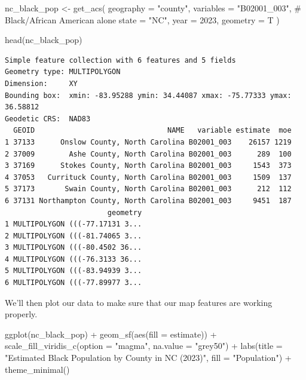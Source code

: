 \documentclass[
  letterpaper,
  DIV=11,
  numbers=noendperiod]{scrartcl}
\newenvironment{Shaded}{\begin{snugshade}}{\end{snugshade}}
\newcommand{\AttributeTok}[1]{\textcolor[rgb]{0.40,0.45,0.13}{#1}}
\newcommand{\CommentTok}[1]{\textcolor[rgb]{0.37,0.37,0.37}{#1}}
\newcommand{\DecValTok}[1]{\textcolor[rgb]{0.68,0.00,0.00}{#1}}
\newcommand{\FunctionTok}[1]{\textcolor[rgb]{0.28,0.35,0.67}{#1}}
\newcommand{\NormalTok}[1]{\textcolor[rgb]{0.00,0.23,0.31}{#1}}
\newcommand{\OtherTok}[1]{\textcolor[rgb]{0.00,0.23,0.31}{#1}}
\newcommand{\SpecialCharTok}[1]{\textcolor[rgb]{0.37,0.37,0.37}{#1}}
\newcommand{\StringTok}[1]{\textcolor[rgb]{0.13,0.47,0.30}{#1}}
\begin{document}
\begin{Shaded}
\begin{Highlighting}[]
\NormalTok{nc\_black\_pop }\OtherTok{\textless{}{-}} \FunctionTok{get\_acs}\NormalTok{(}
  \AttributeTok{geography =} \StringTok{"county"}\NormalTok{,}
  \AttributeTok{variables =} \StringTok{"B02001\_003"}\NormalTok{, }\CommentTok{\# Black/African American alone}
  \AttributeTok{state =} \StringTok{"NC"}\NormalTok{,}
  \AttributeTok{year =} \DecValTok{2023}\NormalTok{,}
  \AttributeTok{geometry =}\NormalTok{ T}
\NormalTok{)}
\end{Highlighting}
\end{Shaded}

\begin{Shaded}
\begin{Highlighting}[]
\FunctionTok{head}\NormalTok{(nc\_black\_pop)}
\end{Highlighting}
\end{Shaded}

\begin{verbatim}
Simple feature collection with 6 features and 5 fields
Geometry type: MULTIPOLYGON
Dimension:     XY
Bounding box:  xmin: -83.95288 ymin: 34.44087 xmax: -75.77333 ymax: 36.58812
Geodetic CRS:  NAD83
  GEOID                               NAME   variable estimate  moe
1 37133      Onslow County, North Carolina B02001_003    26157 1219
2 37009        Ashe County, North Carolina B02001_003      289  100
3 37169      Stokes County, North Carolina B02001_003     1543  373
4 37053   Currituck County, North Carolina B02001_003     1509  137
5 37173       Swain County, North Carolina B02001_003      212  112
6 37131 Northampton County, North Carolina B02001_003     9451  187
                        geometry
1 MULTIPOLYGON (((-77.17131 3...
2 MULTIPOLYGON (((-81.74065 3...
3 MULTIPOLYGON (((-80.4502 36...
4 MULTIPOLYGON (((-76.3133 36...
5 MULTIPOLYGON (((-83.94939 3...
6 MULTIPOLYGON (((-77.89977 3...
\end{verbatim}

We'll then plot our data to make sure that our map features are working
properly.

\begin{Shaded}
\begin{Highlighting}[]
\FunctionTok{ggplot}\NormalTok{(nc\_black\_pop) }\SpecialCharTok{+}
  \FunctionTok{geom\_sf}\NormalTok{(}\FunctionTok{aes}\NormalTok{(}\AttributeTok{fill =}\NormalTok{ estimate)) }\SpecialCharTok{+}
  \FunctionTok{scale\_fill\_viridis\_c}\NormalTok{(}\AttributeTok{option =} \StringTok{"magma"}\NormalTok{, }
                       \AttributeTok{na.value =} \StringTok{"grey50"}\NormalTok{) }\SpecialCharTok{+}
  \FunctionTok{labs}\NormalTok{(}\AttributeTok{title =} \StringTok{"Estimated Black Population by County in NC (2023)"}\NormalTok{,}
       \AttributeTok{fill =} \StringTok{"Population"}\NormalTok{) }\SpecialCharTok{+}
  \FunctionTok{theme\_minimal}\NormalTok{()}
\end{Highlighting}
\end{Shaded}
\end{document}
